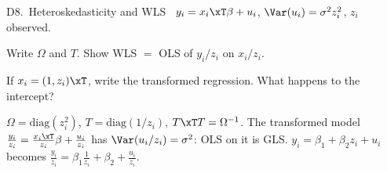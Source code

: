 \begin{qbox}{D8.\ Heteroskedasticity and WLS}{\opt\ \newtag}
$y_{i}=x_{i}\xT\beta+u_{i}$, $\Var(u_{i})=\sigma^{2}z_{i}^{2}$, $z_{i}$ observed.
\begin{flatlist}
  \item[(a)] Write $\Omega$ and $T$. Show WLS $=$ OLS of $y_{i}/z_{i}$ on $x_{i}/z_{i}$.
  \item[(b)] If $x_{i}=(1,z_{i})\xT$, write the transformed regression. What happens to the intercept?
\end{flatlist}
\end{qbox}
\begin{solbox}
 $\Omega=\mathrm{diag}(z_{i}^{2})$, $T=\mathrm{diag}(1/z_{i})$, $T\xT T=\Omega^{-1}$. The transformed model $\frac{y_{i}}{z_{i}}=\frac{x_{i}\xT}{z_{i}}\beta+\frac{u_{i}}{z_{i}}$ has
$\Var(u_{i}/z_{i})=\sigma^{2}$: OLS on it is GLS.
 $y_{i}=\beta_{1}+\beta_{2}z_{i}+u_{i}$ becomes $\frac{y_{i}}{z_{i}}=\beta_{1}\frac{1}{z_{i}}+\beta_{2}+\frac{u_{i}}{z_{i}}$.
\end{solbox}

